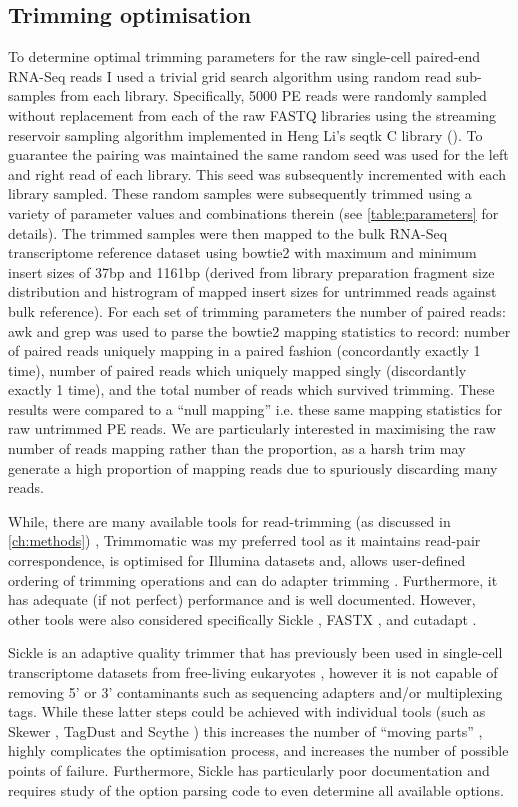 \subsection{Trimming optimisation}
To determine optimal trimming parameters for the raw single-cell paired-end RNA-Seq reads 
I used a trivial grid search algorithm using random read sub-samples from each library.
Specifically, 5000 PE reads were randomly sampled without replacement from each of the raw FASTQ libraries 
using the streaming reservoir sampling \citep{Vitter1985} algorithm implemented in Heng Li's 
seqtk C library (\citep{SeqtkGitHub}).
To guarantee the pairing was maintained the same random seed was used for the left and right read
of each library. This seed was subsequently incremented with each library sampled.
These random samples were subsequently trimmed using a variety of parameter values and combinations therein 
(see \ref{table:parameters} for details).
The trimmed samples were then mapped to the bulk RNA-Seq transcriptome reference dataset using bowtie2
\citep{Langmead2012} with maximum and minimum insert sizes of 37bp and 1161bp (derived from library preparation
fragment size distribution and histrogram of mapped insert sizes for untrimmed reads against bulk reference).
For each set of trimming parameters the number of paired reads: awk and grep was used to parse 
the bowtie2 mapping statistics to record: number of paired reads uniquely mapping in a paired 
fashion (concordantly exactly 1 time), number of paired reads which uniquely mapped 
singly (discordantly exactly 1 time), and the total number of reads which survived trimming.
These results were compared to a ``null mapping'' i.e. these same mapping statistics for raw untrimmed
PE reads.  We are particularly interested in maximising the raw number of reads mapping rather than
the proportion, as a harsh trim may generate a high proportion of mapping reads due to spuriously discarding 
many reads.

While, there are many available tools for read-trimming (as discussed in \ref{ch:methods}) , 
Trimmomatic was my preferred tool as it maintains read-pair correspondence, is optimised for Illumina datasets and, allows user-defined ordering of trimming operations and can do adapter trimming \citep{Bolger2014a}.  
Furthermore, it has adequate (if not perfect) performance and is well documented.
However, other tools were also considered specifically Sickle \citep{JoshiGitHub}, FASTX \citep{gordon2010fastx}, 
and cutadapt \citep{martin2011cutadapt}.

Sickle is an adaptive quality trimmer that has previously been used in single-cell transcriptome datasets 
from free-living eukaryotes \citep{Kolisko2014}, however it is not capable of removing 
 5' or 3' contaminants such as sequencing adapters and/or multiplexing tags.  
While these latter steps could be achieved with individual tools (such as Skewer \citep{Jiang2014}, 
TagDust \citep{Lassmann2009} and Scythe \citep{Buffalo}) this increases the number of ``moving parts'' 
, highly complicates the optimisation process, and increases the number of possible points of failure.  
Furthermore, Sickle has particularly poor documentation and requires study of the option parsing code to 
even determine all available options.

